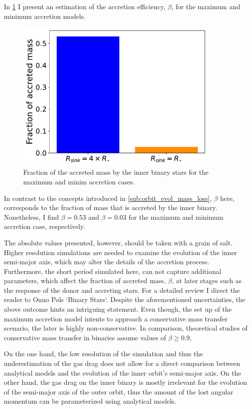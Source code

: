 In \cref{fig:accretion_eff_binary} I present an estimation of the accretion efficiency, $\beta$, for the maximum and minimum accretion models.
\begin{figure}[!htb]
    \centering
    \includegraphics[width=0.9\textwidth]{Thesis/graphs/accretion_case/accretion_binary_acc_efficiency.pdf}
    \caption{Fraction of the accreted mass by the inner binary stars for the maximum and minim accretion cases.}
    \label{fig:accretion_eff_binary}
\end{figure}
In contrast to the concepts introduced in \cref{sub:orbit_evol_mass_loss}, $\beta$ here, corresponds to the fraction of mass that is accreted by the inner binary. Nonetheless, I find $\beta = 0.53$ and $\beta = 0.03$ for the maximum and minimum accretion case, respectively. 

The absolute values presented, however, should be taken with a grain of salt. Higher resolution simulations are needed to examine the evolution of the inner semi-major axis, which may alter the details of the accretion process. Furthermore, the short period simulated here, can not capture additional parameters, which affect the fraction of accreted mass, $\beta$, at later stages such as the response of the donor and accreting stars. For a detailed review I direct the reader to Onno Pols `Binary Stars`. Despite the aforementioned uncertainties, the above outcome hints an intriguing statement. Even though, the set up of the maximum accretion model intents to approach a conservative mass transfer scenario, the later is highly non-conservative. In comparison, theoretical studies of conservative mass transfer in binaries assume values of $\beta \geq 0.9$,

On the one hand, the low resolution of the simulation and thus the underestimation of the gas drag does not allow for a direct comparison between analytical models and the evolution of the inner orbit's semi-major axis. On the other hand, the gas drag on the inner binary is mostly irrelevant for the evolution of the semi-major axis of the outer orbit, thus the amount of the lost angular momentum can be parameterized using analytical models.

